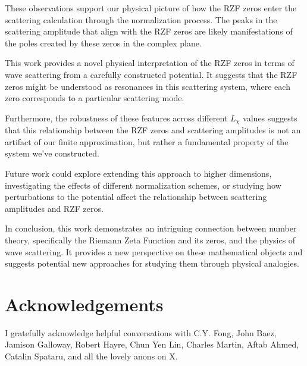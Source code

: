 \documentclass[11pt, oneside]{article}
\begin{document}
These observations support our physical picture of how the RZF zeros enter the scattering calculation through the normalization process. The peaks in the scattering amplitude that align with the RZF zeros are likely manifestations of the poles created by these zeros in the complex plane.

This work provides a novel physical interpretation of the RZF zeros in terms of wave scattering from a carefully constructed potential. It suggests that the RZF zeros might be understood as resonances in this scattering system, where each zero corresponds to a particular scattering mode.

Furthermore, the robustness of these features across different $L_\chi$ values suggests that this relationship between the RZF zeros and scattering amplitudes is not an artifact of our finite approximation, but rather a fundamental property of the system we've constructed.

Future work could explore extending this approach to higher dimensions, investigating the effects of different normalization schemes, or studying how perturbations to the potential affect the relationship between scattering amplitudes and RZF zeros.

In conclusion, this work demonstrates an intriguing connection between number theory, specifically the Riemann Zeta Function and its zeros, and the physics of wave scattering. It provides a new perspective on these mathematical objects and suggests potential new approaches for studying them through physical analogies.

\section{Acknowledgements}
I gratefully acknowledge helpful conversations with C.Y. Fong, John Baez, Jamison Galloway, Robert Hayre, Chun Yen Lin, Charles Martin, Aftab Ahmed, Catalin Spataru, and all the lovely anons on X.

\printbibliography
\end{document}

